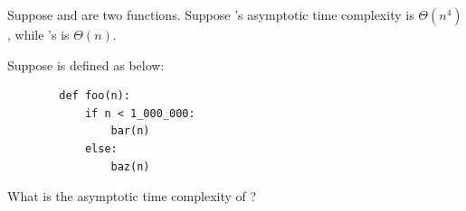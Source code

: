 \begin{prob}
    Suppose  and  are two functions.
    Suppose 's asymptotic time complexity is $\Theta(n^4)$, while
    's is $\Theta(n)$.

    Suppose  is defined as below:

    \begin{verbatim}
        def foo(n):
            if n < 1_000_000:
                bar(n)
            else:
                baz(n)
    \end{verbatim}

    What is the asymptotic time complexity of ?

\end{prob}
